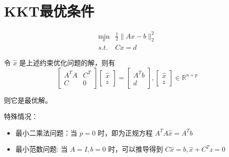 \section{KKT最优条件}

\begin{problem}
    \begin{equation}\begin{aligned}
        \min _{x} & \frac{1}{2}\|A x-b\|_{2}^{2}\\
        s.t. & C x=d
    \end{aligned}\end{equation}
\end{problem}

\begin{theorem}
    令 $ \hat{x} $ 是上述约束优化问题的解，则有
\begin{equation}
\left[\begin{array}{cc}
A^{T} A & C^{T} \\
C& 0
\end{array}\right]\left[\begin{array}{l}
\hat{x} \\
z
\end{array}\right]=\left[\begin{array}{l}
A^{T} b \\
d
\end{array}\right],\left[\begin{array}{l}
\hat{x} \\
z
\end{array}\right] \in \mathbb{R}^{n+p}
\end{equation}

则它是最优解。
\end{theorem}


特殊情况：

\begin{itemize}
    \item 最小二乘法问题：当 $ p=0 $ 时，即为正规方程 $ A^{T} A \hat{x}=A^{T} b $
    \item 最小范数问题: 当 $ A=I, b=0 $ 时，可以推导得到 $ C \hat{x}=b, \hat{x}+C^{T} z=0 $
\end{itemize}


